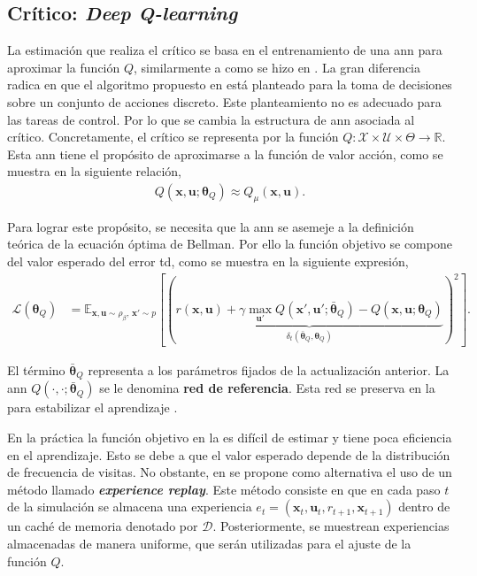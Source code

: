 \subsection{Crítico: \textit{Deep Q-learning}}
\label{sub_sec:DQN}
La estimación que realiza el crítico  se basa en el entrenamiento de una \acrshort{ann} para aproximar la función $Q$, similarmente a como se hizo en \cite{mnih2013}. La gran diferencia radica en que el algoritmo propuesto en \cite{mnih2013} está planteado para la toma de decisiones sobre un conjunto de acciones discreto. Este planteamiento no es adecuado para las tareas de control. Por lo que se cambia la estructura de \acrshort{ann} asociada al crítico. Concretamente, el crítico se representa por la función $Q:\mathcal{X}\times\mathcal{U}\times\Theta \rightarrow \mathbb{R}$. Esta \acrshort{ann} tiene el propósito de aproximarse a la función de valor acción, como se muestra en la siguiente relación,
\begin{align}\label{eq:Deep_Q_approx}
    Q(\mathbf{x}, \mathbf{u}; \bm\theta_{Q}) \approx
Q_{\mu}(\mathbf{x}, \mathbf{u}).    
\end{align}

Para lograr este propósito, se necesita que la \acrshort{ann} se asemeje a la definición teórica de la ecuación óptima de Bellman. Por ello la función objetivo se compone del valor esperado del error \acrshort{td}, como se muestra en la siguiente expresión,
\begin{align}\label{eq:Q_objective}
    \mathcal{L}\left(\bm{\theta}_Q\right) &= \mathbb{E}_{\mathbf{x}, \mathbf{u}\sim \rho_{\beta}\text{, }\mathbf{x}'\sim p}\left[\left(\underbrace{r(\mathbf{x}, \mathbf{u}) + \gamma \max_{\mathbf{u}'}Q\left(\mathbf{x}', \mathbf{u}';\bar{\bm{\theta}}_{Q}\right)-Q\left(\mathbf{x}, \mathbf{u};\bm{\theta}_{Q}\right)}_{\delta_{t}(\bar{\bm\theta}_{Q}, \bm{\theta}_{Q})}\right)^2\right].
\end{align}

El término $\bar{\bm\theta}_{Q}$ representa a los parámetros fijados de la actualización anterior. La \acrshort{ann} $Q(\cdot, \cdot; \bar{\bm\theta}_{Q})$ se le denomina \textbf{red de referencia}. Esta red se preserva en la  para estabilizar el aprendizaje \cite{lillicrap2015continuous}. 

En la práctica la función objetivo en la  
es difícil de estimar y tiene poca eficiencia en el aprendizaje. Esto se debe a que el valor esperado depende de la distribución de frecuencia de visitas. No obstante, en \cite{mnih2013} se propone como alternativa el uso de un método llamado \textit{\textbf{experience replay}}. Este método consiste en que en cada paso $t$ de la simulación se almacena una experiencia $e_t=\left(\mathbf{x}_t, \mathbf{u}_t, r_{t+1}, \mathbf{x}_{t+1}\right)$ dentro de un caché de memoria denotado por $\mathcal{D}$. Posteriormente, se muestrean experiencias almacenadas de manera uniforme, que serán utilizadas para el ajuste de la función $Q$. 

